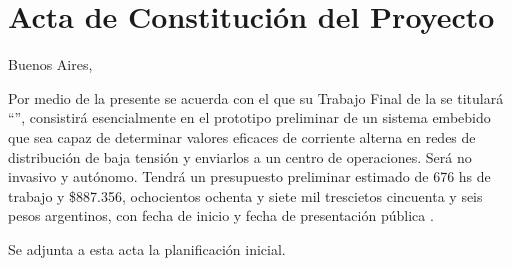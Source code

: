 \documentclass[11pt]{charter}
\begin{document}
\pagebreak



\section{Acta de Constitución del Proyecto}
\label{sec:acta}

\begin{flushright}
Buenos Aires, \fechaInicioName
\end{flushright}

\vspace{2cm}

Por medio de la presente se acuerda con el \authorname\hspace{1px} que su Trabajo Final de la \degreename\hspace{1px} se titulará ``\ttitle'', consistirá esencialmente en el prototipo preliminar de un sistema embebido que sea capaz de determinar valores eficaces de corriente alterna en redes de distribución de baja tensión y enviarlos a un centro de operaciones. Será no invasivo y autónomo. Tendrá un presupuesto preliminar estimado de 676 hs de trabajo y \$887.356, ochocientos ochenta y siete mil trescietos cincuenta y seis pesos argentinos, con fecha de inicio \fechaInicioName\hspace{1px} y fecha de presentación pública \fechaFinalName.

Se adjunta a esta acta la planificación inicial.

\vfill
\end{document}
